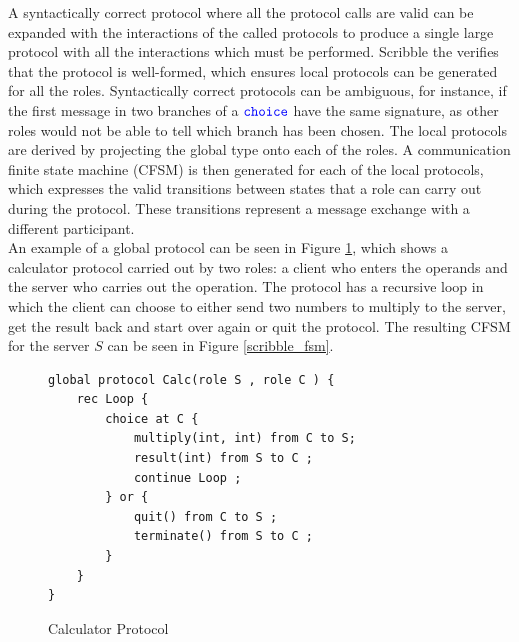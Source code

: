 \documentclass[12pt,twoside]{report}
\begin{document}
A syntactically correct protocol where all the protocol calls are valid can be expanded with the interactions of the called protocols to produce a single large protocol with all the interactions which must be performed. Scribble the verifies that the protocol is well-formed, which ensures local protocols can be generated for all the roles. Syntactically correct protocols can be ambiguous, for instance, if the first message in two branches of a ${\color{blue}\mathtt{choice}}$ have the same signature, as other roles would not be able to tell which branch has been chosen. The local protocols are derived by projecting the global type onto each of the roles. A communication finite state machine (CFSM) is then generated for each of the local protocols, which expresses the valid transitions between states that a role can carry out during the protocol. These transitions represent a message exchange with a different participant.\\

An example of a global protocol can be seen in Figure \ref{scribble_protocol}, which shows a calculator protocol carried out by two roles: a client who enters the operands and the server who carries out the operation. The protocol has a recursive loop in which the client can choose to either send two numbers to multiply to the server, get the result back and start over again or quit the protocol. The resulting CFSM for the server $S$ can be seen in Figure \ref{scribble_fsm}.\\

\begin{figure}[h]
    \centering
    \lstset{language=Scribble}
    \begin{lstlisting}
global protocol Calc(role S , role C ) {
    rec Loop {
    	choice at C {
    		multiply(int, int) from C to S;
    		result(int) from S to C ;
    		continue Loop ;
    	} or {
    		quit() from C to S ;
    		terminate() from S to C ;
    	}
    }
}
    \end{lstlisting}
    \caption{Calculator Protocol}
    \label{scribble_protocol}
\end{figure}{}
\end{document}
